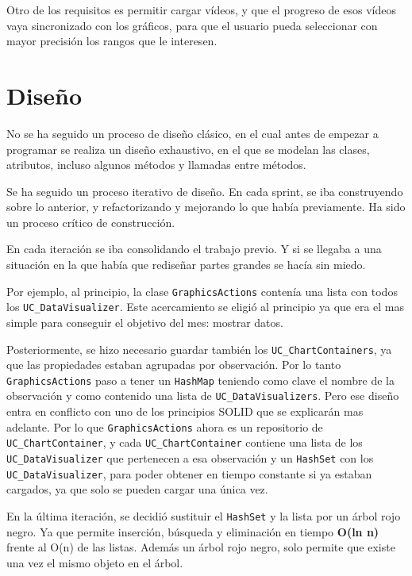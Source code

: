 Otro de los requisitos es permitir cargar v\'ideos, y que el progreso de esos v\'ideos vaya
sincronizado con los gr\'aficos, para que el usuario pueda seleccionar con mayor precisi\'on los
rangos que le interesen.

\section{Dise\~{n}o}
No se ha seguido un proceso de dise\~no cl\'asico, en el cual antes de empezar a programar se realiza
un dise\~no exhaustivo, en el que se modelan las clases, atributos, incluso algunos m\'etodos y
llamadas entre m\'etodos.

Se ha seguido un proceso iterativo de dise\~no. En cada sprint, se iba construyendo sobre lo anterior, y refactorizando
y mejorando lo que hab\'ia previamente. Ha sido un proceso cr\'itico de construcci\'on.

En cada iteraci\'on se iba consolidando el trabajo previo. Y si se llegaba a una situaci\'on en la que hab\'ia que redise\~nar
partes grandes se hac\'ia sin miedo.

Por ejemplo, al principio, la clase \texttt{GraphicsActions} conten\'ia una lista con todos los 
\texttt{UC\_DataVisualizer}. Este
acercamiento se eligi\'o al principio ya que era el mas simple para conseguir el objetivo del mes: mostrar datos.

Posteriormente, se hizo necesario guardar tambi\'en los \texttt{UC\_ChartContainers}, ya que las propiedades estaban agrupadas por
observaci\'on. Por lo tanto \texttt{GraphicsActions} paso a tener un \texttt{HashMap} teniendo como clave el nombre de la 
observaci\'on
y como contenido una lista de \texttt{UC\_DataVisualizers}. Pero ese dise\~no entra en conflicto con uno de los principios
SOLID que se explicar\'an mas adelante. Por lo que \texttt{GraphicsActions} ahora es un repositorio de 
\texttt{UC\_ChartContainer},
y cada \texttt{UC\_ChartContainer} contiene una lista de los\texttt{ UC\_DataVisualizer} que 
pertenecen a esa observaci\'on y un \texttt{HashSet}
con los \texttt{UC\_DataVisualizer}, para poder obtener en tiempo constante si ya estaban cargados, ya que solo se pueden cargar
una \'unica vez.

En la \'ultima iteraci\'on, se decidi\'o sustituir el \texttt{HashSet} y la lista por un \'arbol rojo negro. Ya que permite
inserci\'on, b\'usqueda y eliminaci\'on en tiempo \textbf{O(ln n)} frente al O(n) de las listas. 
Adem\'as un \'arbol rojo negro, solo permite que existe una vez el mismo objeto en el \'arbol.

